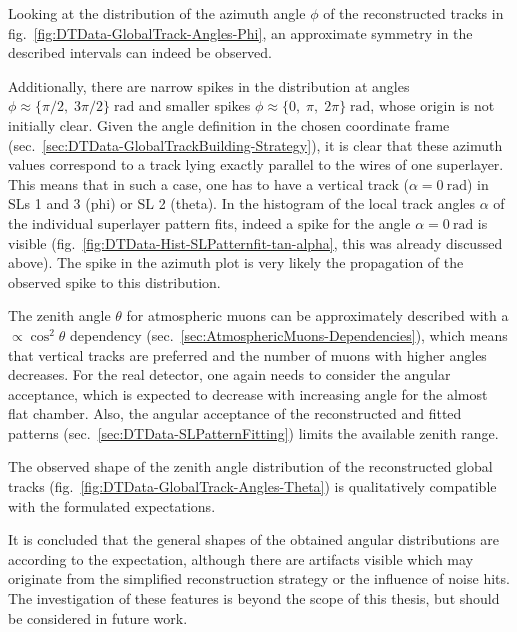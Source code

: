 \par Looking at the distribution of the azimuth angle $\phi$ of the reconstructed tracks in fig.\ \ref{fig:DTData-GlobalTrack-Angles-Phi}, an approximate symmetry in the described intervals can indeed be observed. \par Additionally, there are narrow spikes in the distribution at angles $\phi\approx\{\pi/2,\;3\pi/2\}\;\si{\radian}$ and smaller spikes $\phi\approx\{0,\;\pi,\;2\pi\}\;\si{\radian}$, whose origin is not initially clear. Given the angle definition in the chosen coordinate frame (sec.\ \ref{sec:DTData-GlobalTrackBuilding-Strategy}), it is clear that these azimuth values correspond to a track lying exactly parallel to the wires of one superlayer. This means that in such a case, one has to have a vertical track ($\alpha=\SI{0}{\radian}$) in \acp{SL} 1 and 3 (phi) or \ac{SL} 2 (theta). In the histogram of the local track angles $\alpha$ of the individual superlayer pattern fits, indeed a spike for the angle $\alpha=\SI{0}{\radian}$ is visible (fig.\ \ref{fig:DTData-Hist-SLPatternfit-tan-alpha}, this was already discussed above). The spike in the azimuth plot is very likely the propagation of the observed spike to this distribution.
\par The zenith angle $\theta$ for atmospheric muons can be approximately described with a $\propto \cos^2\theta$ dependency (sec.\ \ref{sec:AtmosphericMuons-Dependencies}), which means that vertical tracks are preferred and the number of muons with higher angles decreases. For the real detector, one again needs to consider the angular acceptance, which is expected to decrease with increasing angle for the almost flat chamber. Also, the angular acceptance of the reconstructed and fitted patterns (sec.\ \ref{sec:DTData-SLPatternFitting}) limits the available zenith range.
\par The observed shape of the zenith angle distribution of the reconstructed global tracks (fig.\ \ref{fig:DTData-GlobalTrack-Angles-Theta}) is qualitatively compatible with the formulated expectations.
\par It is concluded that the general shapes of the obtained angular distributions are according to the expectation, although there are artifacts visible which may originate from the simplified reconstruction strategy or the influence of noise hits. The investigation of these features is beyond the scope of this thesis, but should be considered in future work.
